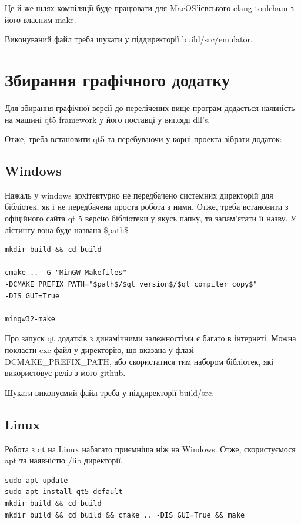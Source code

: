 \documentclass[oneside,final,14pt]{extreport}
\begin{document}
Це й же шлях компіляції буде працювати для MacOS'ісвського clang toolchain з його власним make.

Виконуваний файл треба шукати у піддиректорії build/src/emulator.

\section{Збирання графічного додатку}

Для збирання графічної версії до перелічених вище програм додається наявність на машині qt5 framework у його поставці у вигляді dll's.

Отже, треба встановити qt5 та перебуваючи у корні проекта зібрати додаток:


\subsection{Windows}

Нажаль у windows архітектурно не передбачено системних директорій для бібліотек, як і не передбачена проста робота з ними. Отже, треба встановити з офіційного сайта qt 5 версію бібліотеки у якусь папку, та запам'ятати її назву. У лістингу вона буде названа \$path\$
\begin{tcolorbox}
\begin{verbatim}
mkdir build && cd build

cmake .. -G "MinGW Makefiles"
-DCMAKE_PREFIX_PATH="$path$/$qt version$/$qt compiler copy$" 
-DIS_GUI=True

mingw32-make
\end{verbatim}
\end{tcolorbox}

Про запуск qt додатків з динамічними залежностіми є багато в інтернеті. Можна покласти exe файл у директорію, що вказана у флазі DCMAKE\_PREFIX\_PATH, або скористатися тим набором бібліотек, які використовує реліз з мого github.

Шукати виконуємий файл треба у піддиректорії build/src.

\subsection{Linux}

Робота з qt на Linux набагато приємніша ніж на Windows. Отже, скористуємося apt та наявністю /lib директорії.

\begin{tcolorbox}
\begin{verbatim}
sudo apt update
sudo apt install qt5-default
mkdir build && cd build
mkdir build && cd build && cmake .. -DIS_GUI=True && make
\end{verbatim}
\end{tcolorbox}
\end{document}
